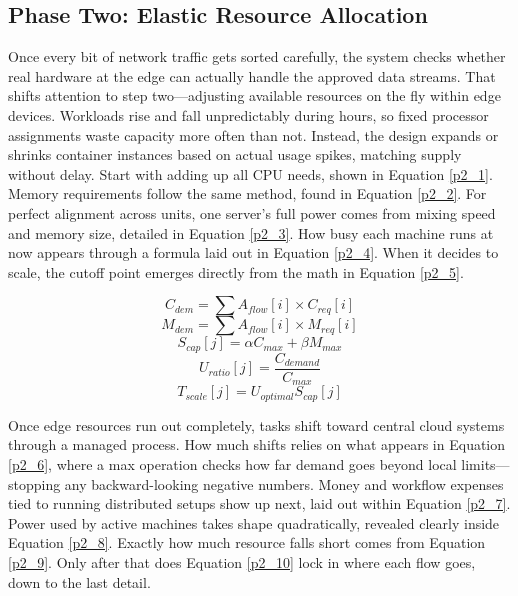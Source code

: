 \documentclass[a4paper,fleqn]{cas-dc}
\numberwithin{equation}{section}
\begin{document}
\subsection{Phase Two: Elastic Resource Allocation}

Once every bit of network traffic gets sorted carefully, the system checks whether real hardware at the edge can actually handle the approved data streams. That shifts attention to step two—adjusting available resources on the fly within edge devices. Workloads rise and fall unpredictably during hours, so fixed processor assignments waste capacity more often than not. Instead, the design expands or shrinks container instances based on actual usage spikes, matching supply without delay. Start with adding up all CPU needs, shown in Equation \ref{p2_1}. Memory requirements follow the same method, found in Equation \ref{p2_2}. For perfect alignment across units, one server's full power comes from mixing speed and memory size, detailed in Equation \ref{p2_3}. How busy each machine runs at now appears through a formula laid out in Equation \ref{p2_4}. When it decides to scale, the cutoff point emerges directly from the math in Equation \ref{p2_5}.

\begin{equation} C_{dem} = \sum A_{flow}[i] \times C_{req}[i] \label{p2_1} \end{equation}
\begin{equation} M_{dem} = \sum A_{flow}[i] \times M_{req}[i] \label{p2_2} \end{equation}
\begin{equation} S_{cap}[j] = \alpha C_{max} + \beta M_{max} \label{p2_3} \end{equation}
\begin{equation} U_{ratio}[j] = \frac{C_{demand}}{C_{max}} \label{p2_4} \end{equation}
\begin{equation} T_{scale}[j] = U_{optimal} S_{cap}[j] \label{p2_5} \end{equation}

Once edge resources run out completely, tasks shift toward central cloud systems through a managed process. How much shifts relies on what appears in Equation \ref{p2_6}, where a max operation checks how far demand goes beyond local limits—stopping any backward-looking negative numbers. Money and workflow expenses tied to running distributed setups show up next, laid out within Equation \ref{p2_7}. Power used by active machines takes shape quadratically, revealed clearly inside Equation \ref{p2_8}. Exactly how much resource falls short comes from Equation \ref{p2_9}. Only after that does Equation \ref{p2_10} lock in where each flow goes, down to the last detail.
\end{document}
